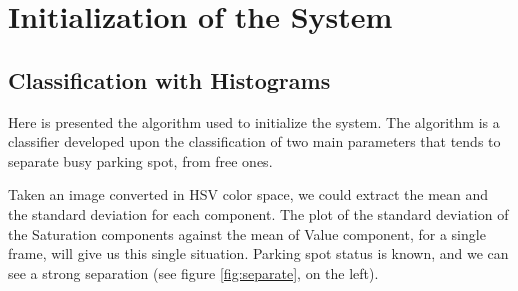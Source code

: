 
\section{Initialization of the System}

	\subsection{Classification with Histograms}
	
	Here is presented the algorithm used to initialize the system. The algorithm is
	a classifier developed upon the classification of two main parameters that
	tends to separate busy parking spot, from free ones. 
	
	Taken an image converted in HSV color space, we could extract the mean and the
	standard deviation for each component. The plot of the standard
	deviation of the Saturation components against the mean of Value component, for
	a single frame, will give us this single situation. Parking spot status is
	known, and we can see a strong separation (see figure \ref{fig:separate}, on
	the left).
	
